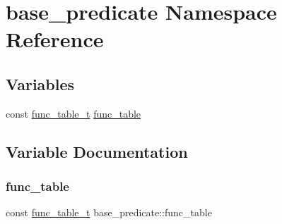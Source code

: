 \hypertarget{namespacebase__predicate}{}\section{base\+\_\+predicate Namespace Reference}
\label{namespacebase__predicate}
\subsection*{Variables}
\begin{DoxyCompactItemize}
\item 
const \mbox{\hyperlink{func__table__t_8hpp_af845869dd1e42c662a4b4f00d1fc528d}{func\+\_\+table\+\_\+t}} \mbox{\hyperlink{namespacebase__predicate_a62610384dce84a5a45b7a8daedc86ecd}{func\+\_\+table}}
\end{DoxyCompactItemize}


\subsection{Variable Documentation}
\mbox{\label{namespacebase__predicate_a62610384dce84a5a45b7a8daedc86ecd}} 
\subsubsection{\texorpdfstring{func\+\_\+table}{func\_table}}
{\footnotesize\ttfamily const \mbox{\hyperlink{func__table__t_8hpp_af845869dd1e42c662a4b4f00d1fc528d}{func\+\_\+table\+\_\+t}} base\+\_\+predicate\+::func\+\_\+table}

